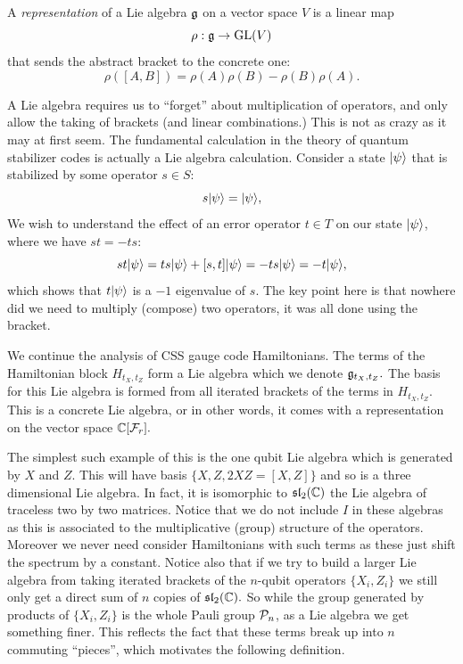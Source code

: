 A \emph{representation} of a Lie algebra $\mathfrak{g}$
on a vector space $V$ 
is a linear map
$$
    \rho : \mathfrak{g} \to \mathrm{GL}(V)
$$
that sends the abstract bracket to the concrete one:
$$
    \rho([A, B]) = \rho(A)\rho(B) - \rho(B)\rho(A).
$$

A Lie algebra requires us to ``forget'' about
multiplication of operators, and only allow the taking of brackets
(and linear combinations.)
This is not as crazy as it may at first seem.
The fundamental calculation in the theory of
quantum stabilizer codes is actually
a Lie algebra calculation.
Consider a state $|{\psi}\rangle$
that is stabilized by some operator $s\in S:$
$$
    s|{\psi}\rangle = |{\psi}\rangle,
$$
We wish to understand the effect of an error operator $t\in T$
on our state $|{\psi}\rangle$, where we have $st = -ts:$
$$
    st|{\psi}\rangle = ts|{\psi}\rangle + [s, t]|{\psi}\rangle = -ts|{\psi}\rangle = -t|{\psi}\rangle,
$$
which shows that $t|{\psi}\rangle$ is a $-1$ eigenvalue of $s.$
The key point here is that nowhere did we need to multiply (compose) two operators,
it was all done using the bracket.

We continue the analysis of CSS gauge code Hamiltonians.
The terms of the Hamiltonian block $H_{t_X,t_Z}$
form a Lie algebra which we denote $\mathfrak{g}_{t_X,t_Z}.$
The basis for this Lie algebra is formed from all iterated 
brackets of the terms in $H_{t_X,t_Z}.$
This is a concrete Lie algebra, or in other words, it comes
with a representation on the vector space $\mathbb{C}[\mathcal{F}_{r}].$

The simplest such example of this is the one qubit Lie algebra
which is generated by $X$ and $Z.$
This will have basis $\{X, Z, 2XZ = [X, Z]\}$
and so is a three dimensional Lie algebra. In fact, it is isomorphic
to $\mathfrak{sl}_2(\mathbb{C})$ the Lie algebra of traceless two by two
matrices.
Notice that we do not include $I$ in these algebras as
this is associated to the multiplicative (group) structure
of the operators. Moreover we never need consider Hamiltonians
with such terms as these just shift the spectrum by a constant.
Notice also that if we try to build a larger Lie algebra
from taking iterated brackets of
the $n$-qubit operators $\{X_i, Z_i\}$ we still only get
a direct sum of $n$ copies of $\mathfrak{sl}_2(\mathbb{C}).$
So while the group generated by products of $\{X_i, Z_i\}$ is the
whole Pauli group $\mathcal{P}_n$, as a Lie algebra we get something finer.
This reflects the fact that these terms break up into $n$
commuting ``pieces'', which motivates the following definition. 

